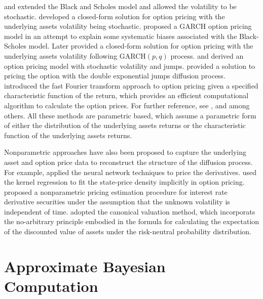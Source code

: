 \citet{scott1987option,hull1987pricing} and \citet{wiggins1987option} extended the
Black and Scholes model and allowed the volatility to be stochastic.
\citet{heston1993closed} developed a closed-form solution for option pricing
with the underlying assets volatility being stochastic. \citet{duan1995garch}
proposed a GARCH option pricing model in an attempt to explain some
systematic biases associated with the Black-Scholes model. Later \citet{heston2000closed} provided a closed-form solution for option pricing
with the underlying assets volatility following GARCH$(p,q)$ process.
\citet{bates1996jumps} and  \citet{bakshi1997empirical} derived an option pricing
model with stochastic volatility and jumps. \citet{kou2002jump} provided a
solution to pricing the option with the double exponential jumps diffusion
process. \citet{carr1999option} introduced the fast Fourier transform
approach to option pricing given a specified characteristic function
of the return, which provides an efficient computational algorithm
to calculate the option prices. For further reference, see \citet{duffie2000transform,bakshi2000spanning},  and \citet{carr2009saddlepoint} among
others. All these methods are parametric based, which assume a parametric
form of either the distribution of the underlying assets returns or
the characteristic function of the underlying assets returns. 

Nonparametric approaches have also been proposed to capture the underlying
asset and option price data to reconstruct the structure of the diffusion
process. For example, \citet{hutchinson1994nonparametric} applied the
neural network techniques to price the derivatives. \citet{ait1998nonparametric} used the kernel regression to fit the state-price density
implicitly in option pricing. \citet{ait1996nonparametric} proposed a nonparametric
pricing estimation procedure for interest rate derivative securities
under the assumption that the unknown volatility is independent of
time. \citet{stutzer1996simple} adopted the canonical valuation method, which
incorporats the no-arbitrary principle embodied in the formula for
calculating the expectation of the discounted value of assets under
the risk-neutral probability distribution. %




\section{Approximate Bayesian Computation}

